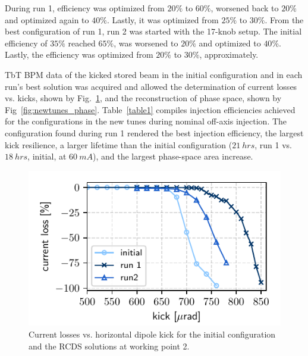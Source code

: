 \documentclass[a4paper,
               keeplastbox,   %
               ]{jacow}
\begin{document}
 During run 1, efficiency was optimized from $20\%$ to $60\%$, worsened back to $20\%$ and optimized again to $40\%$. Lastly, it was optimized from $25\%$ to $30\%$. From the best configuration  of run 1, run 2 was started with the 17-knob setup. The initial efficiency of $35\%$ reached $65\%$, was worsened to $20\%$ and optimized to $40\%$. Lastly, the efficiency was optimized from $20\%$ to $30\%$, approximately.

TbT BPM data of the kicked stored beam  in the initial configuration and in each run's best solution was acquired and allowed the determination of current losses vs. kicks, shown by Fig.~\ref{fig:loss_kicks_newtunes}, and the reconstruction of phase space, shown by Fig~\ref{fig:newtunes_phase}. Table~\ref{table1} compiles injection efficiencies achieved for the configurations in the new tunes during nominal off-axis injection. The configuration found during run 1 rendered the best injection efficiency, the largest kick resilience, a larger lifetime than the initial configuration ($21~\unit{hrs}$, run 1 vs. $18~\unit{hrs}$, initial, at $60~\unit{mA}$), and the largest phase-space area increase.
\begin{figure}[!h]
   \includegraphics[width=\columnwidth]{WEPL087_f3.pdf}
   \caption{Current losses vs. horizontal dipole kick for the initial configuration and the RCDS solutions at working point 2.}
   \label{fig:loss_kicks_newtunes}
\end{figure}
\end{document}
